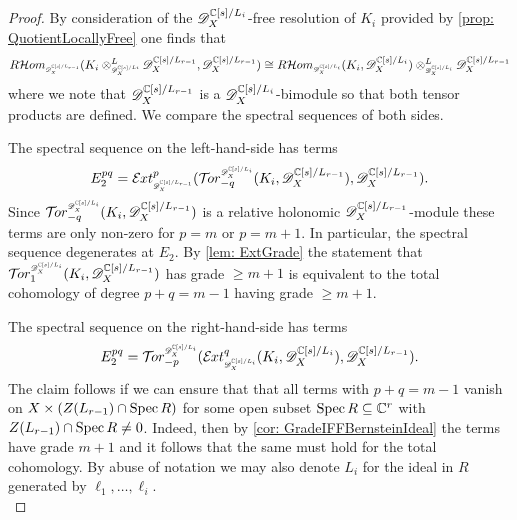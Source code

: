 \begin{proof}
  By consideration of the $\mathscr{D}_{X}^{\mathbb{C}[s]/L_{i}}$-free resolution of $K_i$ provided by \cref{prop: QuotientLocallyFree} one finds that
  $$R \Hom_{\scaleto{\D_\X^{ \C[s]/L_{r-1} }}{8pt} }(K_i\otimes^L_{\scaleto{ \D_\X^{\C[s]/L{i}} }{8pt} } \D_\X^{\C[s]/L_{r-1} },\D_\X^{ \C[s]/L_{r-1}} ) \cong R \Hom_{ \scaleto{\D_\X^{\C[s]/L_{i}}}{8pt} } (K_i,\D_\X^{\C[s]/L_{i}}) \otimes^L_{\scaleto{ \D_\X^{\C[s]/L_{i}}}{8pt} } \D_\X^{\C[s]/L_{r-1}}$$
  where we note that $\mathscr{D}_X^{\mathbb{C}[s]/L_{r-1}}$ is a $\mathscr{D}_X^{\mathbb{C}[s]/L_{i}}$-bimodule so that both tensor products are defined.
  We compare the spectral sequences of both sides.

  The spectral sequence on the left-hand-side has terms
  $$E^{pq}_2 = \Ex{\D_\X^{\C[s]/L_{r-1}}}{p}(\Tr{\D_\X^{\C[s]/L_{i}} }{-q}(K_i,\D_X^{\C[s]/L_{r-1}}),\D_\X^{\C[s]/L_{r-1}}).$$
  Since $\Tr{\D_\X^{\C[s]/L_{i}} }{-q}(K_i,\D_X^{\C[s]/L_{r-1}})$ is a relative holonomic $\mathscr{D}_X^{\mathbb{C}[s]/L_{r-1}}$-module these terms are only non-zero for $p=m$ or $p = m+1$.
  In particular, the spectral sequence degenerates at $E_2$.
  By \cref{lem: ExtGrade} the statement that $\Tr{\D_\X^{\C[s]/L_i}}{1}(K_i, \D_\X^{\C[s]/L_{r-1}})$ has grade $\geq m+1$ is equivalent to the total cohomology of degree $p + q = m-1$ having grade $\geq m+1$.

  The spectral sequence on the right-hand-side has terms
  $$E_2^{pq} = \Tr{\D_\X^{\C[s]/L_{i}} }{-p}(\Ex{ \D_\X^{\C[s]/L_{i}} }{q} (K_i,\D_\X^{\C[s]/L_{i}}), \D_\X^{\C[s]/L_{r-1}}).$$
  The claim follows if we can ensure that that all terms with $p+q = m -1$ vanish on $X\times(Z(L_{r-1})\cap\operatorname{Spec} R)$ for some open subset $\operatorname{Spec} R\subseteq \mathbb{C}^r$ with $Z(L_{r-1})\cap \operatorname{Spec} R \neq 0$.
  Indeed, then by \cref{cor: GradeIFFBernsteinIdeal} the terms have grade $m+1$ and it follows that the same must hold for the total cohomology.
  By abuse of notation we may also denote $L_i$ for the ideal in $R$ generated by $\ell_1,\ldots,\ell_i$.
  \\


\end{proof}
